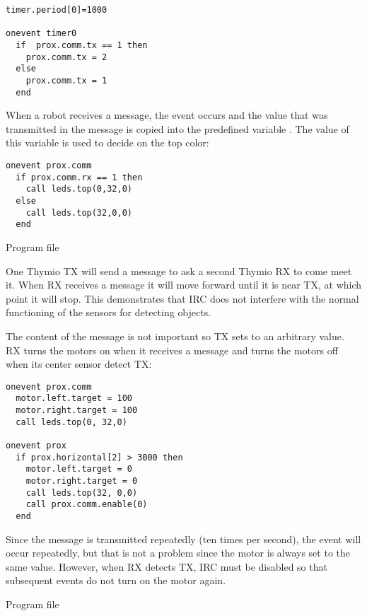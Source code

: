 \begin{verbatim}
timer.period[0]=1000

onevent timer0
  if  prox.comm.tx == 1 then
  	prox.comm.tx = 2
  else
  	prox.comm.tx = 1
  end
\end{verbatim}

When a robot receives a message, the event  occurs and the
value that was transmitted in the message is copied into the predefined
variable . The value of this variable is used to decide
on the top color:
\begin{verbatim}
onevent prox.comm
  if prox.comm.rx == 1 then
  	call leds.top(0,32,0)
  else
  	call leds.top(32,0,0)
  end
\end{verbatim}

{\raggedleft \hfill Program file }



One Thymio TX will send a message to ask a second Thymio RX to come meet
it. When RX receives a message it will move forward until it is near TX,
at which point it will stop. This demonstrates that IRC does not
interfere with the normal functioning of the sensors for detecting
objects.

The content of the message is not important so TX sets 
to an arbitrary value. RX turns the motors on when it receives a message
and turns the motors off when its center sensor detect TX:

\begin{verbatim}
onevent prox.comm
  motor.left.target = 100
  motor.right.target = 100
  call leds.top(0, 32,0)

onevent prox
  if prox.horizontal[2] > 3000 then
    motor.left.target = 0
    motor.right.target = 0
    call leds.top(32, 0,0)
    call prox.comm.enable(0)
  end
\end{verbatim}

Since the message is transmitted repeatedly (ten times per second), the
event  will occur repeatedly, but that is not a problem
since the motor is always set to the same value. However, when RX detects
TX, IRC must be disabled so that subsequent events do not turn on the
motor again.

{\raggedleft \hfill Program file }


